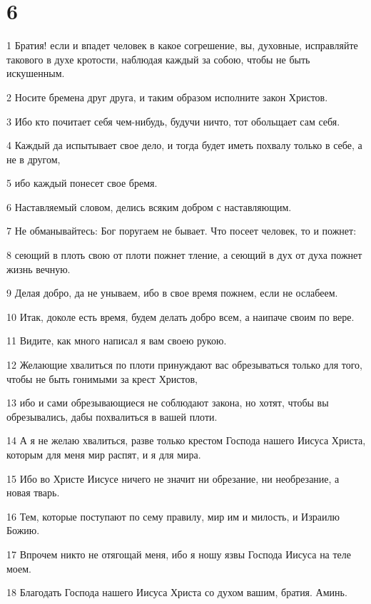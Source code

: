 \chapter{6}

\par 1 Братия! если и впадет человек в какое согрешение, вы, духовные, исправляйте такового в духе кротости, наблюдая каждый за собою, чтобы не быть искушенным.
\par 2 Носите бремена друг друга, и таким образом исполните закон Христов.
\par 3 Ибо кто почитает себя чем-нибудь, будучи ничто, тот обольщает сам себя.
\par 4 Каждый да испытывает свое дело, и тогда будет иметь похвалу только в себе, а не в другом,
\par 5 ибо каждый понесет свое бремя.
\par 6 Наставляемый словом, делись всяким добром с наставляющим.
\par 7 Не обманывайтесь: Бог поругаем не бывает. Что посеет человек, то и пожнет:
\par 8 сеющий в плоть свою от плоти пожнет тление, а сеющий в дух от духа пожнет жизнь вечную.
\par 9 Делая добро, да не унываем, ибо в свое время пожнем, если не ослабеем.
\par 10 Итак, доколе есть время, будем делать добро всем, а наипаче своим по вере.
\par 11 Видите, как много написал я вам своею рукою.
\par 12 Желающие хвалиться по плоти принуждают вас обрезываться только для того, чтобы не быть гонимыми за крест Христов,
\par 13 ибо и сами обрезывающиеся не соблюдают закона, но хотят, чтобы вы обрезывались, дабы похвалиться в вашей плоти.
\par 14 А я не желаю хвалиться, разве только крестом Господа нашего Иисуса Христа, которым для меня мир распят, и я для мира.
\par 15 Ибо во Христе Иисусе ничего не значит ни обрезание, ни необрезание, а новая тварь.
\par 16 Тем, которые поступают по сему правилу, мир им и милость, и Израилю Божию.
\par 17 Впрочем никто не отягощай меня, ибо я ношу язвы Господа Иисуса на теле моем.
\par 18 Благодать Господа нашего Иисуса Христа со духом вашим, братия. Аминь.


